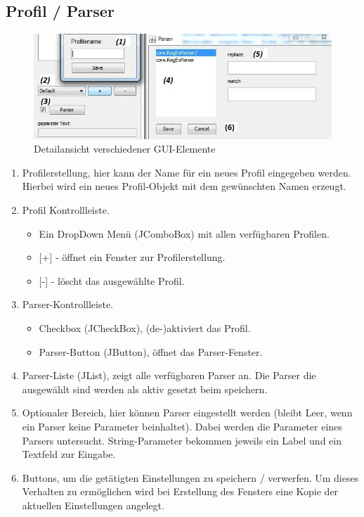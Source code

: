 \documentclass[a4paper,11pt,abstracton,titlepage]{scrartcl}
\begin{document}
\subsection{Profil / Parser}
\begin{figure}[hb]
  \centering
\includegraphics[width=\dimexpr\textwidth]{GUI_profil_parser.png}
  \caption[GUI Beschreibung]%
  {Detailansicht verschiedener GUI-Elemente}
\end{figure}
\begin{enumerate}
\item Profilerstellung, hier kann der Name für ein neues Profil eingegeben werden.
 Hierbei wird ein neues Profil-Objekt mit dem gewünschten Namen erzeugt.
\newpage
\item Profil Kontrollleiste. 
\begin{itemize}
\item Ein DropDown Menü (JComboBox) mit allen verfügbaren Profilen.
\item{[+] - öffnet ein Fenster zur Profilerstellung.}
\item{[-] - löscht das ausgewählte Profil.}
\end{itemize}

\item Parser-Kontrollleiste. 
\begin{itemize} 
\item Checkbox (JCheckBox), (de-)aktiviert das Profil.
\item Parser-Button (JButton), öffnet das Parser-Fenster.
\end{itemize}

\item Parser-Liste (JList), zeigt alle verfügbaren Parser an. Die Parser die
ausgewählt sind werden als aktiv gesetzt beim speichern.

\item Optionaler Bereich, hier können Parser eingestellt werden (bleibt Leer, wenn
ein Parser keine Parameter beinhaltet).
 Dabei werden die Parameter eines Parsers untersucht. String-Parameter bekommen
jeweils ein Label und ein Textfeld zur Eingabe.

\item Buttons, um die getätigten Einstellungen zu speichern / verwerfen. Um dieses
Verhalten zu ermöglichen wird bei Erstellung des Fensters eine Kopie der
aktuellen Einstellungen angelegt.
\end{enumerate}
\end{document}
